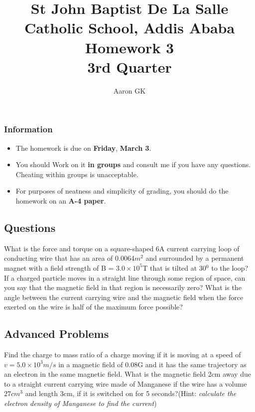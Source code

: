 \documentclass[9pt,addpoints]{exam}
\author{Aaron GK}
\begin{document}
	\title{St John Baptist De La Salle Catholic School, Addis Ababa\\
		\large Homework 3 \\
		3rd Quarter}
	\maketitle
	\begin{center}
		\subsubsection*{Information}
		\begin{itemize}
			\item The homework is due on \textbf{Friday}, \textbf{March 3}.
			\item You should Work on it \textbf{in groups} and consult me if you have any questions. Cheating within groups is unacceptable.
			\item For purposes of neatness and simplicity of grading, you should do the homework on an \textbf{A-4 paper}.
		\end{itemize}
	\end{center}
	\begin{center}
		\subsection*{Questions}
	\end{center}

	\begin{questions}
		\question What is the force and torque on a square-shaped 6A current carrying loop of conducting wire that has an area of 0.0064$m^2$ and surrounded by a permanent magnet with a field strength of B = $3.0\times10^5$T that is tilted at 30$^0$ to the loop?
		\question If a charged particle moves in a straight line through some region of space, can you say that the magnetic field in that region is necessarily zero?
		\question What is the angle between the current carrying wire and the magnetic field when the force exerted on the wire is half of the maximum force possible?
		\subsection*{Advanced Problems}
		\question Find the charge to mass ratio of a charge moving if it is moving at a speed of $v = 5.0\times10^3 m/s$ in a magnetic field of 0.08G and it has the same trajectory as an electron in the same magnetic field.
		\question What is the magnetic field 2cm away due to a straight current carrying wire made of Manganese if the wire has a volume $27cm^3$ and length 3cm, if it is switched on for 5 seconds?(Hint: \textit{calculate the electron density of Manganese to find the current})
	\end{questions}		
\end{document}
